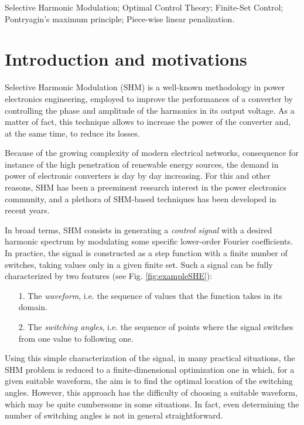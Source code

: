 \documentclass[9pt,shortpaper,twoside,web]{ieeecolor}
\begin{document}
\begin{IEEEkeywords}
	Selective Harmonic Modulation; Optimal Control Theory; Finite-Set Control; Pontryagin's maximum principle; Piece-wise linear penalization.
\end{IEEEkeywords}

\section{Introduction and motivations}\label{Section1}

Selective Harmonic Modulation (SHM) \cite{Sun1992,Sun1996} is a well-known methodology in power electronics engineering, employed to improve the performances of a converter by controlling the phase and amplitude of the harmonics in its output voltage. As a matter of fact, this technique allows to increase the power of the converter and, at the same time, to reduce its losses. 

Because of the growing complexity of modern electrical networks, consequence for instance of the high penetration of renewable energy sources, the demand in power of electronic converters is day by day increasing. For this and other reasons, SHM has been a preeminent research interest in the power electronics community, and a plethora of SHM-based techniques has been developed in recent years. 

In broad terms, SHM consists in generating a \textit{control signal} with a desired harmonic spectrum by modulating some specific lower-order Fourier coefficients. In practice, the signal is constructed as a step function with a finite number of switches, taking values only in a given finite set. Such a signal can be fully characterized by two features (see Fig. \ref{fig:exampleSHE}): 
\begin{itemize}
	\item[1.] The \textit{waveform}, i.e. the sequence of values that the function takes in its domain.
	\item[2.] The \textit{switching angles}, i.e. the sequence of points where the signal switches from one value to following one. 
\end{itemize}

Using this simple characterization of the signal, in many practical situations, the SHM problem is reduced to a finite-dimensional optimization one in which, for a given suitable waveform, the aim is to find the optimal location of the switching angles. However, this approach has the  difficulty of choosing a suitable waveform,  which may be quite cumbersome in some situations.  In fact, even determining the number of switching angles is not in general straightforward. 
\end{document}
